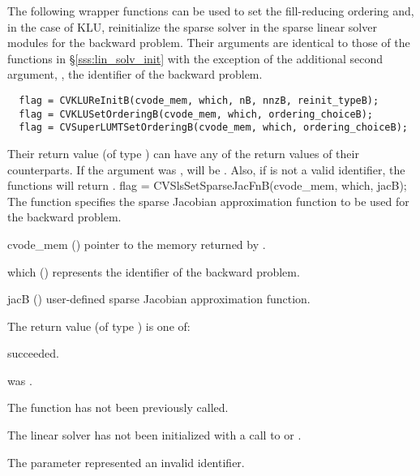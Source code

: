 The following wrapper functions can be used to set the fill-reducing
ordering and, in the case of KLU, reinitialize the sparse solver in the
sparse linear solver modules for the backward problem.  
Their arguments are identical to those
of the functions in \S\ref{sss:lin_solv_init} with the exception of the additional
second argument, , the identifier of the backward problem.
\begin{verbatim}
  flag = CVKLUReInitB(cvode_mem, which, nB, nnzB, reinit_typeB);
  flag = CVKLUSetOrderingB(cvode_mem, which, ordering_choiceB);
  flag = CVSuperLUMTSetOrderingB(cvode_mem, which, ordering_choiceB);
\end{verbatim}
Their return value  (of type ) can have any of the return 
values of their counterparts.
If the  argument was , 
 will be .
Also, if  is not a valid identifier, the functions will return 
.
{
  flag = CVSlsSetSparseJacFnB(cvode\_mem, which, jacB);
}
{
  The function  specifies the sparse Jacobian
  approximation function to be used for the backward problem.
}
{
  \begin{args}
  \item[cvode\_mem] ()
    pointer to the {\cvodes} memory returned by .
  \item[which] ()
    represents the identifier of the backward problem.
  \item[jacB] ()
    user-defined sparse Jacobian approximation function.
  \end{args}
}
{
  The return value  (of type ) is one of:
  \begin{args}
  \item[\Id{CVSLS\_SUCCESS}] 
     succeeded.
  \item[\Id{CVSLS\_MEM\_NULL}]
     was .
  \item[\Id{CVSLS\_NO\_ADJ}]
    The function  has not been previously called.
  \item[\Id{CVSLS\_LMEM\_NULL}]
    The linear solver has not been initialized with a call to 
    or .
  \item[\Id{CVSLS\_ILL\_INPUT}]
    The parameter  represented an invalid identifier.
  \end{args}
}
